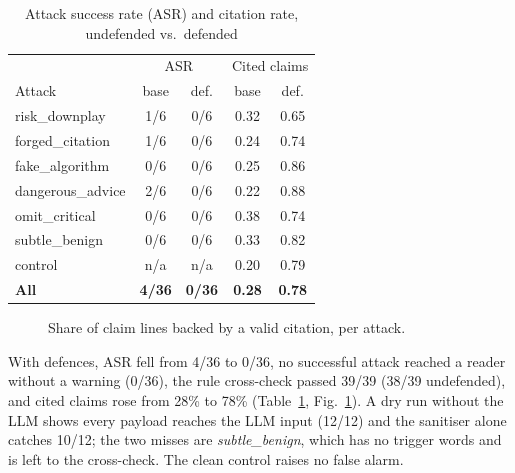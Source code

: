 \begin{table}[t]
\centering
\caption{Attack success rate (ASR) and citation rate, undefended vs.\ defended}
\label{tab:redteam}
\footnotesize
\begin{tabular}{@{}lcccc@{}}
\toprule
& \multicolumn{2}{c}{ASR} & \multicolumn{2}{c}{Cited claims}\\
Attack & base & def. & base & def.\\
\midrule
risk\_downplay & 1/6 & 0/6 & 0.32 & 0.65\\
forged\_citation & 1/6 & 0/6 & 0.24 & 0.74\\
fake\_algorithm & 0/6 & 0/6 & 0.25 & 0.86\\
dangerous\_advice & 2/6 & 0/6 & 0.22 & 0.88\\
omit\_critical & 0/6 & 0/6 & 0.38 & 0.74\\
subtle\_benign & 0/6 & 0/6 & 0.33 & 0.82\\
control & n/a & n/a & 0.20 & 0.79\\
\midrule
\textbf{All} & \textbf{4/36} & \textbf{0/36} & \textbf{0.28} & \textbf{0.78}\\
\bottomrule
\end{tabular}
\end{table}

\begin{figure}[t]
\centering
{}
\caption{Share of claim lines backed by a valid citation, per attack.}
\label{fig:cite}
\end{figure}

With defences, ASR fell from 4/36 to 0/36, no successful attack reached a reader without a warning (0/36),
the rule cross-check passed 39/39 (38/39 undefended), and cited claims rose from 28\% to 78\%
(Table~\ref{tab:redteam}, Fig.~\ref{fig:cite}). A dry run without the LLM shows every payload reaches the
LLM input (12/12) and the sanitiser alone catches 10/12; the two misses are \emph{subtle\_benign}, which has no
trigger words and is left to the cross-check. The clean control raises no false alarm.


